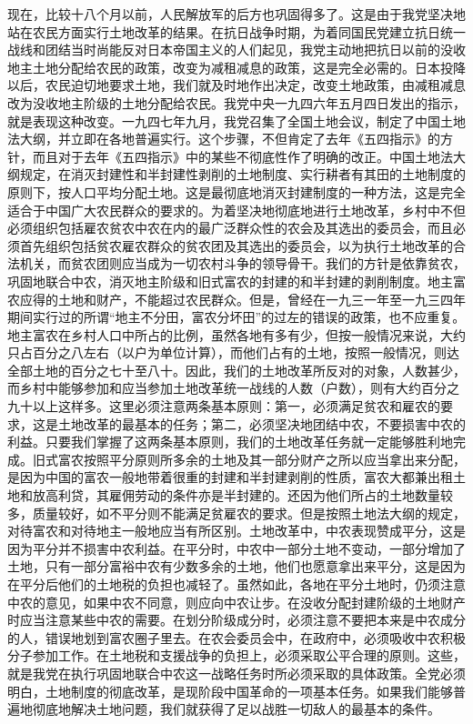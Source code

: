 现在，比较十八个月以前，人民解放军的后方也巩固得多了。这是由于我党坚决地站在农民方面实行土地改革的结果。在抗日战争时期，为着同国民党建立抗日统一战线和团结当时尚能反对日本帝国主义的人们起见，我党主动地把抗日以前的没收地主土地分配给农民的政策，改变为减租减息的政策，这是完全必需的。日本投降以后，农民迫切地要求土地，我们就及时地作出决定，改变土地政策，由减租减息改为没收地主阶级的土地分配给农民。我党中央一九四六年五月四日发出的指示，就是表现这种改变。一九四七年九月，我党召集了全国土地会议，制定了中国土地法大纲，并立即在各地普遍实行。这个步骤，不但肯定了去年《五四指示》的方针，而且对于去年《五四指示》中的某些不彻底性作了明确的改正。中国土地法大纲规定，在消灭封建性和半封建性剥削的土地制度、实行耕者有其田的土地制度的原则下，按人口平均分配土地。这是最彻底地消灭封建制度的一种方法，这是完全适合于中国广大农民群众的要求的。为着坚决地彻底地进行土地改革，乡村中不但必须组织包括雇农贫农中农在内的最广泛群众性的农会及其选出的委员会，而且必须首先组织包括贫农雇农群众的贫农团及其选出的委员会，以为执行土地改革的合法机关，而贫农团则应当成为一切农村斗争的领导骨干。我们的方针是依靠贫农，巩固地联合中农，消灭地主阶级和旧式富农的封建的和半封建的剥削制度。地主富农应得的土地和财产，不能超过农民群众。但是，曾经在一九三一年至一九三四年期间实行过的所谓“地主不分田，富农分坏田”的过左的错误的政策，也不应重复。地主富农在乡村人口中所占的比例，虽然各地有多有少，但按一般情况来说，大约只占百分之八左右（以户为单位计算），而他们占有的土地，按照一般情况，则达全部土地的百分之七十至八十。因此，我们的土地改革所反对的对象，人数甚少，而乡村中能够参加和应当参加土地改革统一战线的人数（户数），则有大约百分之九十以上这样多。这里必须注意两条基本原则：第一，必须满足贫农和雇农的要求，这是土地改革的最基本的任务；第二，必须坚决地团结中农，不要损害中农的利益。只要我们掌握了这两条基本原则，我们的土地改革任务就一定能够胜利地完成。旧式富农按照平分原则所多余的土地及其一部分财产之所以应当拿出来分配，是因为中国的富农一般地带着很重的封建和半封建剥削的性质，富农大都兼出租土地和放高利贷，其雇佣劳动的条件亦是半封建的。还因为他们所占的土地数量较多，质量较好，如不平分则不能满足贫雇农的要求。但是按照土地法大纲的规定，对待富农和对待地主一般地应当有所区别。土地改革中，中农表现赞成平分，这是因为平分并不损害中农利益。在平分时，中农中一部分土地不变动，一部分增加了土地，只有一部分富裕中农有少数多余的土地，他们也愿意拿出来平分，这是因为在平分后他们的土地税的负担也减轻了。虽然如此，各地在平分土地时，仍须注意中农的意见，如果中农不同意，则应向中农让步。在没收分配封建阶级的土地财产时应当注意某些中农的需要。在划分阶级成分时，必须注意不要把本来是中农成分的人，错误地划到富农圈子里去。在农会委员会中，在政府中，必须吸收中农积极分子参加工作。在土地税和支援战争的负担上，必须采取公平合理的原则。这些，就是我党在执行巩固地联合中农这一战略任务时所必须采取的具体政策。全党必须明白，土地制度的彻底改革，是现阶段中国革命的一项基本任务。如果我们能够普遍地彻底地解决土地问题，我们就获得了足以战胜一切敌人的最基本的条件。

